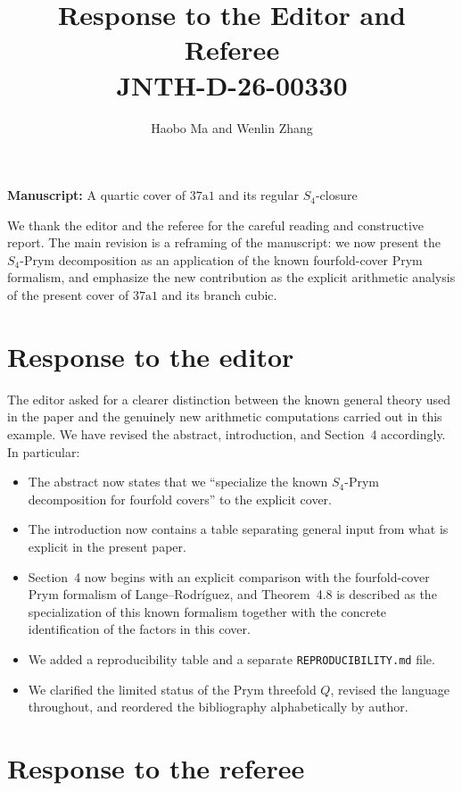 \documentclass[11pt,letterpaper]{article}
\title{Response to the Editor and Referee\\
JNTH-D-26-00330}
\author{Haobo Ma and Wenlin Zhang}
\date{}
\begin{document}
\maketitle

\noindent\textbf{Manuscript:} A quartic cover of \(37\mathrm{a}1\) and its regular \(S_4\)-closure

\bigskip

We thank the editor and the referee for the careful reading and constructive report. The main revision is a reframing of the manuscript: we now present the \(S_4\)-Prym decomposition as an application of the known fourfold-cover Prym formalism, and emphasize the new contribution as the explicit arithmetic analysis of the present cover of \(37\mathrm{a}1\) and its branch cubic.

\section*{Response to the editor}

The editor asked for a clearer distinction between the known general theory used in the paper and the genuinely new arithmetic computations carried out in this example. We have revised the abstract, introduction, and Section~4 accordingly. In particular:
\begin{itemize}
\item The abstract now states that we ``specialize the known \(S_4\)-Prym decomposition for fourfold covers'' to the explicit cover.
\item The introduction now contains a table separating general input from what is explicit in the present paper.
\item Section~4 now begins with an explicit comparison with the fourfold-cover Prym formalism of Lange--Rodr{\'i}guez, and Theorem~4.8 is described as the specialization of this known formalism together with the concrete identification of the factors in this cover.
\item We added a reproducibility table and a separate \texttt{REPRODUCIBILITY.md} file.
\item We clarified the limited status of the Prym threefold \(Q\), revised the language throughout, and reordered the bibliography alphabetically by author.
\end{itemize}

\section*{Response to the referee}
\end{document}
